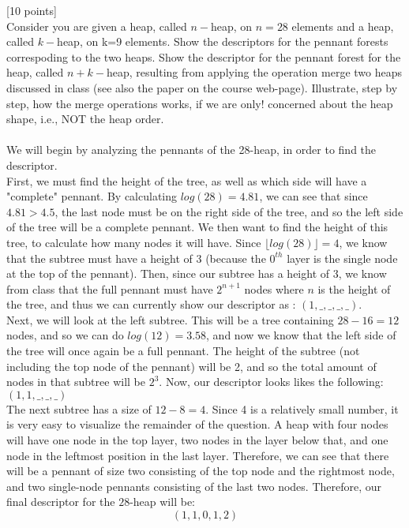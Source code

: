 \documentclass[12pt]{article}
\newcounter{ques}
\newenvironment{question}{\stepcounter{ques}{\noindent\bf Question \arabic{ques}:}}{\vspace{5mm}}
\begin{document}
\begin{question}[10 points]\\
Consider you are given a heap, called $n-$heap, on $n=28$ elements and a heap, called $k-$heap, on k=9  elements. Show the
 descriptors for the pennant forests correspoding to the two heaps. Show the descriptor for the pennant forest for the heap, called $n+k-$heap,
resulting from applying the operation merge two heaps discussed in class (see also the paper on the course web-page). Illustrate, step by step,  how the merge operations works, if we are only! concerned about
the heap shape, i.e., NOT the heap order.\\\\

We will begin by analyzing the pennants of the 28-heap, in order to find the descriptor.\\
First, we must find the height of the tree, as well as which side will have a "complete" pennant. By calculating $log(28)=4.81$, we can see that since $4.81>4.5$, the last node must be on the right side of the tree, and so the left side of the tree will be a complete pennant. We then want to find the height of this tree, to calculate how many nodes it will have. Since $\lfloor log(28)\rfloor=4$, we know that the subtree must have a height of 3 (because the $0^{th}$ layer is the single node at the top of the pennant). Then, since our subtree has a height of 3, we know from class that the full pennant must have $2^{n+1}$ nodes where $n$ is the height of the tree, and thus we can currently show our descriptor as : $(1,\_,\_,\_,\_)$.\\
Next, we will look at the left subtree. This will be a tree containing $28-16=12$ nodes, and so we can do $log(12)=3.58$, and now we know that the left side of the tree will once again be a full pennant. The height of the subtree (not including the top node of the pennant) will be 2, and so the total amount of nodes in that subtree will be $2^{3}$. Now, our descriptor looks likes the following: $(1,1,\_,\_,\_)$\\
The next subtree has a size of $12-8=4$. Since 4 is a relatively small number, it is very easy to visualize the remainder of the question. A heap with four nodes will have one node in the top layer, two nodes in the layer below that, and one node in the leftmost position in the last layer. Therefore, we can see that there will be a pennant of size two consisting of the top node and the rightmost node, and two single-node pennants consisting of the last two nodes. Therefore, our final descriptor for the $28$-heap will be:
$$(1,1,0,1,2)$$


\end{question}
\end{document}
